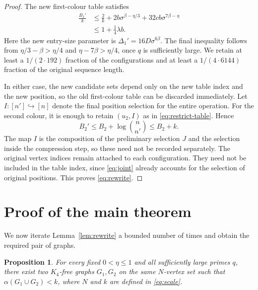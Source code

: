 \documentclass[11pt]{article}
\newtheorem{proposition}[theorem]{Proposition}
\theoremstyle{definition}
\theoremstyle{remark}
\begin{document}
\begin{proof}
The new first-colour table satisfies
\begin{align*}
 \frac{B_1'}k
 &\le\frac2k+2b\sigma^{\beta-\eta/3}
             +32cb\sigma^{7\beta-\eta}\\
 &\le1+\tfrac14\lambda b.
\end{align*}
Here the new entry-size parameter is
$\Delta_1'=16D\sigma^{6\beta}$. The final inequality follows from
$\eta/3-\beta>\eta/4$ and $\eta-7\beta>\eta/4$, once $q$ is sufficiently
large. We retain at least a $1/(2\cdot192)$ fraction of the
configurations and at least a $1/(4\cdot6144)$ fraction of the original
sequence length.

\medskip
In either case, the new candidate sets depend only on the new table
index and the new position, so the old first-colour table can be
discarded immediately. Let $I:[n']\hookrightarrow[n]$ denote the final
position selection for the entire operation. For the second colour,
it is enough to retain $(u_2,I)$ as in \eqref{eq:restrict-table}. Hence
\[
 B_2'\le B_2+\log\binom n{n'}\le B_2+k.
\]
The map $I$ is the composition of the preliminary selection $J$ and
the selection inside the compression step, so these need not be
recorded separately. The original vertex indices remain attached to
each configuration. They need not be included in the table index,
since \eqref{eq:joint} already accounts for the selection of original
positions. This proves \eqref{eq:rewrite}.
\end{proof}

\section{Proof of the main theorem}\label{sec:main-proof}

We now iterate Lemma~\ref{lem:rewrite} a bounded number of times and
obtain the required pair of graphs.

\begin{proposition}\label{prop:construction}
For every fixed $0<\eta\le1$ and all sufficiently large primes $q$,
there exist two $K_4$-free graphs $G_1,G_2$ on the same $N$-vertex set
such that $\alpha(G_1\cup G_2)<k$, where $N$ and $k$ are defined in
\eqref{eq:scale}.
\end{proposition}
\end{document}
